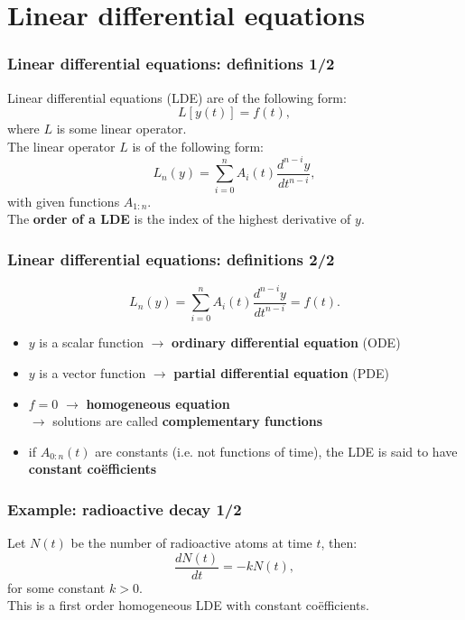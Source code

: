 \section{Linear differential equations}

\begin{frame}
\frametitle{Linear differential equations: definitions 1/2}
Linear differential equations (LDE) are of the following form:
\begin{equation*}
L[y(t)] = f(t),
\end{equation*}
where $L$ is some linear operator. \\
The linear operator $L$ is of the following form:
\begin{equation*}
L_n(y) = \sum_{i=0}^{n} A_i(t) \frac{d^{n-i}y}{dt^{n-i}},
\end{equation*}
with given functions $A_{1:n}$.\\
The \textbf{order of a LDE} is the index of the highest derivative of $y$.
\end{frame}

\begin{frame}
\frametitle{Linear differential equations: definitions 2/2}
\begin{equation*}
L_n(y) = \sum_{i=0}^{n} A_i(t) \frac{d^{n-i}y}{dt^{n-i}} = f(t).
\end{equation*}
\begin{itemize}
\item $y$ is a scalar function $\rightarrow$ \textbf{ordinary differential equation} (ODE)
\item $y$ is a vector function $\rightarrow$ \textbf{partial differential equation} (PDE) \\
\item $f = 0$ $\rightarrow$ \textbf{homogeneous equation} \\
$\rightarrow$ solutions are called \textbf{complementary functions} \\
\item if $A_{0:n}(t)$ are constants (i.e. not functions of time), the LDE is said to have \textbf{constant coëfficients}
\end{itemize}
\end{frame}

\begin{frame}
\frametitle{Example: radioactive decay 1/2}
Let $N(t)$ be the number of radioactive atoms at time $t$, then:
\begin{equation*}
\frac{dN(t)}{dt} = - k N(t),
\end{equation*}
for some constant $k>0$. \\
This is a first order homogeneous LDE with constant coëfficients.
\end{frame}

